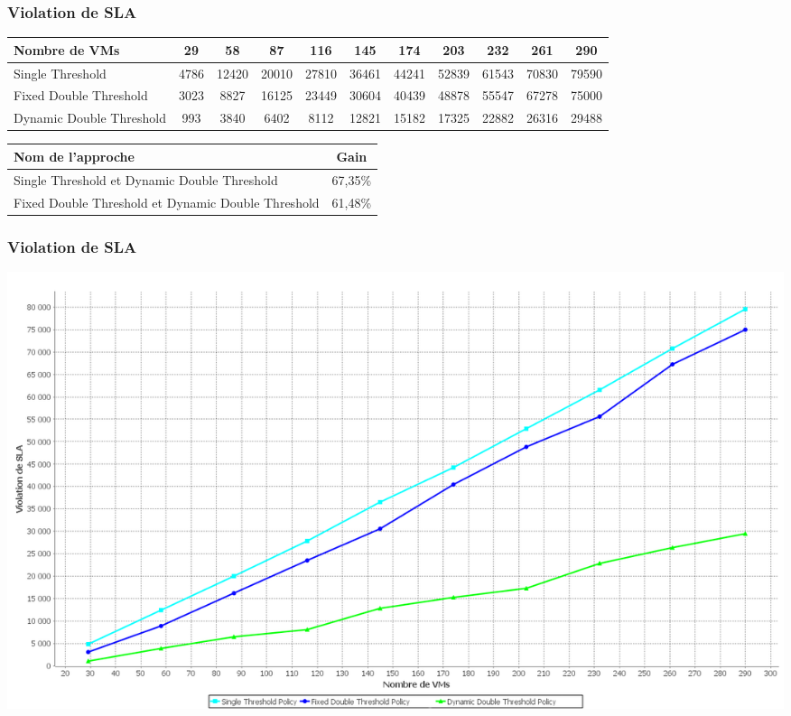 \documentclass[xcolor=dvipsnames]{beamer}
\begin{document}
\begin{frame}
\frametitle{Violation de SLA}
\begin{center}
{\tiny  \begin{tabular}{|p{2.5cm}|c|c|c|c|c|c|c|c|c|c|}
\hline
      \centering     Nombre de VMs &  29& 58& 87& 116& 145& 174& 203& 232& 261& 290\\
\hline
      \centering      Single Threshold &  4786& 12420& 20010& 27810& 36461& 44241& 52839& 61543& 70830& 79590\\
\hline
      \centering     \color{red}Fixed Double Threshold &  3023& 8827& 16125& 23449& 30604& 40439& 48878& 55547& 67278& 75000\\
\hline
      \centering     \color{red}Dynamic Double Threshold &  993& 3840& 6402& 8112& 12821& 15182& 17325& 22882& 26316& 29488\\
\hline
\end{tabular}}
\end{center}



\begin{center}
{\tiny   \begin{tabular}{|p{3.5cm}|c|}
\hline
      \centering      Nom de l’approche&  Gain\\
\hline
      \centering      Single Threshold et Dynamic Double Threshold&  67,35\%\\
\hline
      \centering      Fixed Double Threshold et Dynamic Double Threshold&  61,48\%\\
\hline
\end{tabular}}

\end{center}
\end{frame}

\begin{frame}
\frametitle{Violation de SLA}
\begin{center}
\includegraphics[scale=0.25]{sh3.png}
\end{center}
\end{frame}
\end{document}
